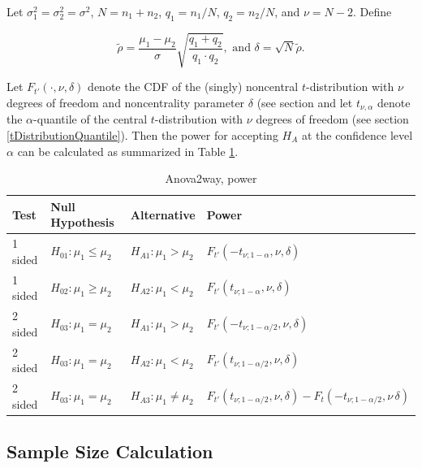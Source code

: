\vspace{0.3cm}
Let $\sigma_1^2 = \sigma_2^2 = \sigma^2$, $N = n_1 + n_2$, $q_1 = n_1 /N$, $q_2 = n_2 /N$, and $\nu=N-2$. Define

\begin{equation} \label{eq:Anova2wayPower}
	\widetilde{\rho} = \frac{\mu_1-\mu_2}{\sigma} \sqrt{\frac{q_1+q_2}{q_1 \cdot q_2}}, \text{ and } \delta = \sqrt{N} \widetilde{\rho}.
\end{equation}


Let $F_{t'}\left(\cdot, \nu, \delta \right)$ denote the CDF of the (singly) noncentral $t$-distribution with $\nu$ degrees of freedom and noncentrality parameter $\delta$ (see section 
and let $t_{\nu,\alpha}$ denote the $\alpha$-quantile of the central $t$-distribution with $\nu$ degrees of freedom (see section \ref{tDistributionQuantile}).
Then the power for accepting $H_A$ at the confidence level $\alpha$ can be calculated as summarized in Table \ref{TableAnova2way,power}.


\begin{table}[ht]
	\centering
	\begin{tabular}{|l|l|l|l|}
		\hline
		Test &Null Hypothesis &Alternative & Power \\
		\hline
		1 sided & $H_{01}: \mu_1 \leq \mu_2$ & $H_{A1}: \mu_1 > \mu_2$ & $F_{t'}\left(-t_{\nu;1-\alpha}, \nu, \delta \right)$ \\
		1 sided & $H_{02}: \mu_1 \geq \mu_2$ & $H_{A2}: \mu_1 < \mu_2$ & $F_{t'}\left(t_{\nu;1-\alpha}, \nu, \delta \right)$  \\
		\hline
		2 sided & $H_{03}: \mu_1 = \mu_2$ & $H_{A1}: \mu_1 > \mu_2$ & $F_{t'}\left(-t_{\nu;1-\alpha/2}, \nu, \delta \right)$ \\
		2 sided & $H_{03}: \mu_1 = \mu_2$ & $H_{A2}: \mu_1 < \mu_2$ & $F_{t'}\left(t_{\nu;1-\alpha/2}, \nu, \delta \right)$  \\
		2 sided & $H_{03}: \mu_1 = \mu_2$ & $H_{A3}: \mu_1 \neq \mu_2$ & $F_{t'}\left(t_{\nu;1-\alpha/2}, \nu, \delta \right)-F_t\left(-t_{\nu;1-\alpha/2}, \nu\, \delta \right)$ \\
		\hline
	\end{tabular}
	\caption{Anova2way, power}
	\label{TableAnova2way,power}
\end{table}



\newpage
\subsection{Sample Size Calculation}

